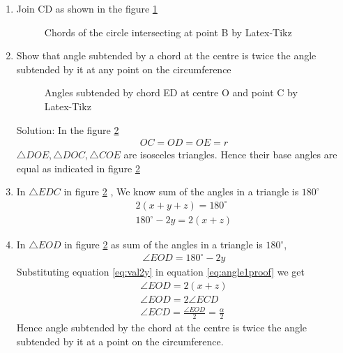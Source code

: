\renewcommand{\theequation}{\theenumi}
\begin{enumerate}[label=\thesection.\arabic*.,ref=\thesection.\theenumi]

\item Join CD as shown in the figure \ref{fig:intersecting_chords}
\begin{figure}[!ht]
\centering
\resizebox{\columnwidth}{!}{}
\caption{Chords of the circle intersecting at point B by Latex-Tikz}
\label{fig:intersecting_chords}	
\end{figure}

\item Show that angle subtended by a chord at the centre is twice the angle subtended by it at any point on the circumference
\begin{figure}[!ht]
\centering
\resizebox{\columnwidth}{!}{}
\caption{Angles subtended by chord ED at centre O and point C by Latex-Tikz}
\label{fig:chord_proof}	
\end{figure}
\newline
Solution:
\newline
In the figure \ref{fig:chord_proof}	
\begin{align}
OC = OD = OE = r
\end{align}
$\triangle DOE, \triangle DOC, \triangle COE$ are isosceles triangles.
\newline
Hence their base angles are equal as indicated in figure \ref{fig:chord_proof}

\item In $\triangle EDC$ in figure \ref{fig:chord_proof} , We know sum of the angles in a triangle is $180^{\circ}$
\begin{align}
2(x+y+z) = 180^{\circ}
\\
180^{\circ} - 2y = 2(x+z)
\label{eq:val2y}
\end{align}

\item In $\triangle EOD$ in figure \ref{fig:chord_proof} as sum of the angles in a triangle is $180^{\circ}$,
\begin{align}
\angle EOD = 180^{\circ} - 2y
\label{eq:angle1proof}
\end{align}
Substituting equation \ref{eq:val2y} in equation \ref{eq:angle1proof} we get 
\begin{align}
\angle EOD = 2(x+z)
\\
\angle EOD = 2 \angle ECD
\\
\angle ECD = \frac{\angle EOD}{2} = \frac{\alpha}{2}
\label{eq:angle1}
\end{align}
Hence angle subtended by the chord at the centre is twice the angle subtended by it at a point on the circumference.


\end{enumerate}
